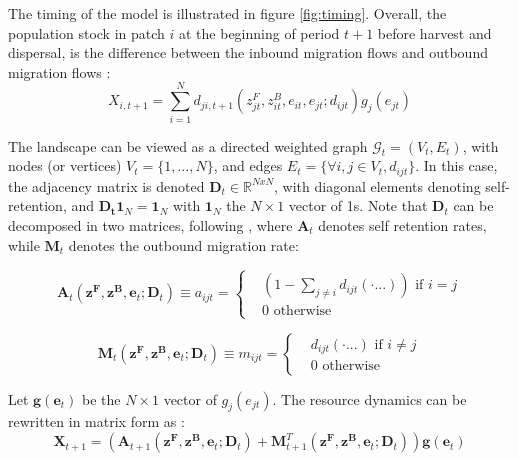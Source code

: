 \documentclass{article}
\begin{document}
The timing of the model is illustrated in figure \ref{fig:timing}. Overall, the population stock in patch $i$ at the beginning of period $t+1$ before harvest and dispersal, is the difference between the inbound migration flows and outbound migration flows : 
\begin{equation}
X_{i,t+1} = \sum_{i=1}^N d_{ji,t+1}\left(z_{jt}^F, z_{it}^B, e_{it}, e_{jt}; d_{ijt}\right) g_j(e_{jt})
\label{eq:resource_dynamics}
\end{equation}



The landscape can be viewed as a directed weighted graph $\mathcal{G}_t = (V_t, E_t)$, with nodes (or vertices) $V_t = \{1,..., N\}$, and edges $E_t = \{\forall i,j \in V_t, d_{ijt}\}$. In this case, the adjacency matrix is denoted $\mathbf{D}_t \in \mathbb{R}^{NxN}$, with diagonal elements denoting self-retention, and $\mathbf{D_t}\mathbf{1}_N = \mathbf{1}_N$ with $\mathbf{1}_N$ the $N\times 1$ vector of 1s. Note that $\mathbf{D}_t$ can be decomposed in two matrices, following \cite{fabbri_competition_2022}, where $\mathbf{A}_t$ denotes self retention rates, while $\mathbf{M}_t$ denotes the outbound migration rate:

\begin{equation*}
\mathbf{A}_t\left(\mathbf{z^F}, \mathbf{z^B}, \mathbf{e}_t; \mathbf{D}_t\right) \equiv a_{ijt} = 
\begin{cases}
	&\left(1 - \sum_{j\neq i} d_{ijt}(\cdot...)\right) \text{ if } i=j\\
	&0 \text{ otherwise }
\end{cases}
\end{equation*}

\begin{equation*}
\mathbf{M}_t\left(\mathbf{z^F}, \mathbf{z^B}, \mathbf{e}_t; \mathbf{D}_t\right) \equiv m_{ijt} = 
\begin{cases}
	& d_{ijt}(\cdot...) \text{ if } i\neq j\\
	&0 \text{ otherwise }
\end{cases}
\end{equation*}

Let $\mathbf{g}(\mathbf{e}_t)$ be the $N\times 1$ vector of $g_j(e_{jt})$. The resource dynamics can be rewritten in matrix form as : 
\begin{equation}
\mathbf{X}_{t+1} = (\mathbf{A}_{t+1} \left(\mathbf{z^F}, \mathbf{z^B}, \mathbf{e}_t; \mathbf{D}_t\right)+ \mathbf{M}_{t+1}^T\left(\mathbf{z^F}, \mathbf{z^B}, \mathbf{e}_t; \mathbf{D}_t\right))\mathbf{g}(\mathbf{e}_t)
\end{equation}
\end{document}
